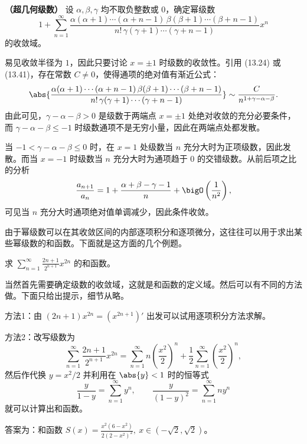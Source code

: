 \begin{xexample}[14.3.2]
\textbf{（超几何级数）} 设 $\alpha,\beta,\gamma$ 均不取负整数或 $0$，确定幂级数
\[
  1+\sum_{n=1}^{\infty}\frac{\alpha(\alpha+1)\cdots(\alpha+n-1)\,\beta(\beta+1)\cdots(\beta+n-1)}{n!\,\gamma(\gamma+1)\cdots(\gamma+n-1)}x^n
\]
的收敛域。
\end{xexample}
\begin{xsolution}
易见收敛半径为 $1$，因此只要讨论 $x=\pm1$ 时级数的收敛性。引用 (13.24) 或 (13.41)，存在常数 $C\ne0$，使得通项的绝对值有渐近公式：
\[
  \abs{\frac{\alpha(\alpha+1)\cdots(\alpha+n-1)\,\beta(\beta+1)\cdots(\beta+n-1)}{n!\,\gamma(\gamma+1)\cdots(\gamma+n-1)}}
  \sim\frac{C}{n^{1+\gamma-\alpha-\beta}}.
\]
由此可见，$\gamma-\alpha-\beta>0$ 是级数于两端点 $x=\pm1$ 处绝对收敛的充分必要条件，而 $\gamma-\alpha-\beta\leqslant-1$ 时级数通项不是无穷小量，因此在两端点处都发散。

当 $-1<\gamma-\alpha-\beta\leqslant0$ 时，在 $x=1$ 处级数当 $n$ 充分大时为正项级数，因此发散。而当 $x=-1$ 时级数当 $n$ 充分大时为通项趋于 $0$ 的交错级数。从前后项之比的分析
\[
  \frac{a_{n+1}}{a_n}=1+\frac{\alpha+\beta-\gamma-1}{n}+\bigO\left(\frac1{n^2}\right),
\]
可见当 $n$ 充分大时通项绝对值单调减少，因此条件收敛。
\end{xsolution}

由于幂级数可以在其收敛区间的内部逐项积分和逐项微分，这往往可以用于求出某些幂级数的和函数。下面就是这方面的几个例题。

\begin{xexample}[14.3.3]
求 $\displaystyle\sum_{n=1}^{\infty}\frac{2n+1}{2^{n+1}}x^{2n}$ 的和函数。
\end{xexample}
\begin{xsolution}
当然首先需要确定级数的收敛域，这就是和函数的定义域。然后可以有不同的方法做。下面只给出提示，细节从略。

方法1：由 $(2n+1)x^{2n}=(x^{2n+1})'$ 出发可以试用逐项积分方法求解。

方法2：改写级数为
\[
  \sum_{n=1}^{\infty}\frac{2n+1}{2^{n+1}}x^{2n}
  =\sum_{n=1}^{\infty}n\left(\frac{x^2}{2}\right)^n
  +\frac12\sum_{n=1}^{\infty}\left(\frac{x^2}{2}\right)^n,
\]
然后作代换 $y=x^2/2$ 并利用在 $\abs{y}<1$ 时的恒等式
\[
  \frac{y}{1-y}=\sum_{n=1}^{\infty}y^n,
  \qquad
  \frac{y}{(1-y)^2}=\sum_{n=1}^{\infty}ny^n
\]
就可以计算出和函数。

答案为：和函数 $\displaystyle S(x)=\frac{x^2(6-x^2)}{2(2-x^2)^2},\ x\in(-\sqrt2,\sqrt2)$。
\end{xsolution}

